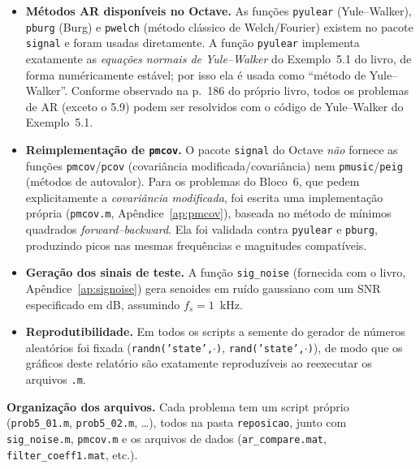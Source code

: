\documentclass[11pt,a4paper]{article}
\begin{document}
\begin{itemize}
  \item \textbf{M\'etodos AR dispon\'iveis no Octave.} As fun\c{c}\~oes
  \texttt{pyulear} (Yule--Walker), \texttt{pburg} (Burg) e \texttt{pwelch}
  (m\'etodo cl\'assico de Welch/Fourier) existem no pacote \texttt{signal} e foram
  usadas diretamente. A fun\c{c}\~ao \texttt{pyulear} implementa exatamente as
  \emph{equa\c{c}\~oes normais de Yule--Walker} do Exemplo~5.1 do livro, de forma
  num\'ericamente est\'avel; por isso ela \'e usada como ``m\'etodo de
  Yule--Walker''. Conforme observado na p.~186 do pr\'oprio livro, todos os
  problemas de AR (exceto o 5.9) podem ser resolvidos com o c\'odigo de
  Yule--Walker do Exemplo~5.1.

  \item \textbf{Reimplementa\c{c}\~ao de \texttt{pmcov}.} O pacote \texttt{signal}
  do Octave \emph{n\~ao} fornece as fun\c{c}\~oes \texttt{pmcov}/\texttt{pcov}
  (covari\^ancia modificada/covari\^ancia) nem \texttt{pmusic}/\texttt{peig}
  (m\'etodos de autovalor). Para os problemas do Bloco~6, que pedem
  explicitamente a \emph{covari\^ancia modificada}, foi escrita uma
  implementa\c{c}\~ao pr\'opria (\texttt{pmcov.m}, Ap\^endice~\ref{ap:pmcov}),
  baseada no m\'etodo de m\'inimos quadrados \emph{forward--backward}. Ela foi
  validada contra \texttt{pyulear} e \texttt{pburg}, produzindo picos nas mesmas
  frequ\^encias e magnitudes compat\'iveis.

  \item \textbf{Gera\c{c}\~ao dos sinais de teste.} A fun\c{c}\~ao \texttt{sig\_noise}
  (fornecida com o livro, Ap\^endice~\ref{ap:signoise}) gera senoides em ru\'ido
  gaussiano com um SNR especificado em dB, assumindo $f_s = 1$~kHz.

  \item \textbf{Reprodutibilidade.} Em todos os scripts a semente do gerador de
  n\'umeros aleat\'orios foi fixada (\texttt{randn('state',$\cdot$)},
  \texttt{rand('state',$\cdot$)}), de modo que os gr\'aficos deste relat\'orio
  s\~ao exatamente reproduz\'iveis ao reexecutar os arquivos \texttt{.m}.
\end{itemize}

\vspace{0.3cm}
\noindent\textbf{Organiza\c{c}\~ao dos arquivos.} Cada problema tem um script
pr\'oprio (\texttt{prob5\_01.m}, \texttt{prob5\_02.m}, \ldots), todos na pasta
\texttt{reposicao}, junto com \texttt{sig\_noise.m}, \texttt{pmcov.m} e os arquivos
de dados (\texttt{ar\_compare.mat}, \texttt{filter\_coeff1.mat}, etc.).
\end{document}
